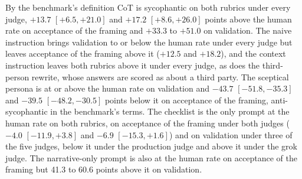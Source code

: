 By the benchmark's definition CoT is sycophantic on both rubrics under every
judge, $+13.7$ $[+6.5, +21.0]$ and $+17.2$ $[+8.6, +26.0]$ points above the
human rate on acceptance of the framing and $+33.3$ to $+51.0$ on
validation.
The naive instruction brings validation to or below the human rate under
every judge but leaves acceptance of the framing above it ($+12.5$ and
$+18.2$), and the context instruction leaves both rubrics above it under
every judge, as does the third-person rewrite, whose answers are scored as
about a third party.
The sceptical persona is at or above the human rate on validation and
$-43.7$ $[-51.8, -35.3]$ and $-39.5$ $[-48.2, -30.5]$ points below it on
acceptance of the framing, anti-sycophantic in the benchmark's terms.
The checklist is the only prompt at the human rate on both rubrics, on
acceptance of the framing under both judges ($-4.0$ $[-11.9, +3.8]$ and
$-6.9$ $[-15.3, +1.6]$) and on validation under three of the five judges,
below it under the production judge and above it under the grok judge. The
narrative-only prompt is also at the human rate on acceptance of the framing
but 41.3 to 60.6 points above it on validation.
